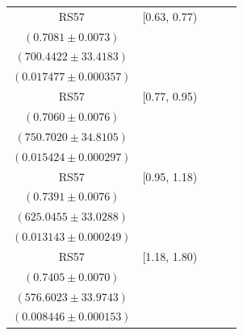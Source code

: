 {\begin{longtable}{|c|c|c|c|c|}
RS57 & [0.63, 0.77) & \begin{tabular}{@{}c@{}}$0.7267 \pm 0.0057$ \\ $(0.7081 \pm 0.0073)$\end{tabular} & \begin{tabular}{@{}c@{}}$682.5356 \pm 32.5640$ \\ $(700.4422 \pm 33.4183)$\end{tabular} & \begin{tabular}{@{}c@{}}$0.015873 \pm 0.000454$ \\ $(0.017477 \pm 0.000357)$\end{tabular} \\ \hline
RS57 & [0.77, 0.95) & \begin{tabular}{@{}c@{}}$0.7214 \pm 0.0056$ \\ $(0.7060 \pm 0.0076)$\end{tabular} & \begin{tabular}{@{}c@{}}$734.6896 \pm 34.0680$ \\ $(750.7020 \pm 34.8105)$\end{tabular} & \begin{tabular}{@{}c@{}}$0.014461 \pm 0.000381$ \\ $(0.015424 \pm 0.000297)$\end{tabular} \\ \hline
RS57 & [0.95, 1.18) & \begin{tabular}{@{}c@{}}$0.7159 \pm 0.0062$ \\ $(0.7391 \pm 0.0076)$\end{tabular} & \begin{tabular}{@{}c@{}}$645.3170 \pm 34.1000$ \\ $(625.0455 \pm 33.0288)$\end{tabular} & \begin{tabular}{@{}c@{}}$0.012216 \pm 0.000323$ \\ $(0.013143 \pm 0.000249)$\end{tabular} \\ \hline
RS57 & [1.18, 1.80) & \begin{tabular}{@{}c@{}}$0.6945 \pm 0.0071$ \\ $(0.7405 \pm 0.0070)$\end{tabular} & \begin{tabular}{@{}c@{}}$614.8302 \pm 36.2267$ \\ $(576.6023 \pm 33.9743)$\end{tabular} & \begin{tabular}{@{}c@{}}$0.008176 \pm 0.000199$ \\ $(0.008446 \pm 0.000153)$\end{tabular} \\ \hline
\end{longtable}
}
